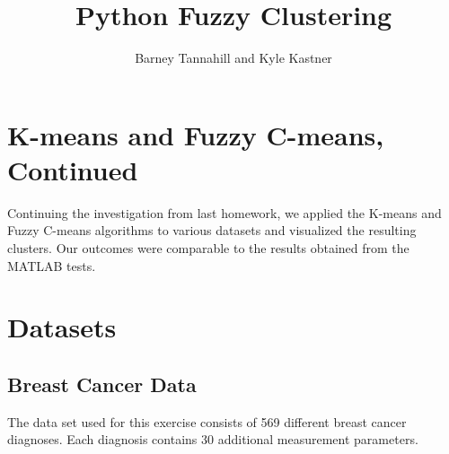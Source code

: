 \documentclass{article}
\begin{document}
\title{Python Fuzzy Clustering}
\author{Barney Tannahill and Kyle Kastner}

\maketitle

\section*{K-means and Fuzzy C-means, Continued}
Continuing the investigation from last homework, we applied the K-means and 
Fuzzy C-means algorithms to various datasets and visualized the resulting clusters.
Our outcomes were comparable to the results obtained from the MATLAB tests. 

\section*{Datasets}
\subsection*{Breast Cancer Data}
The data set used for this exercise consists of 569 different breast cancer diagnoses. 
Each diagnosis contains 30 additional measurement parameters. 
\end{document}
